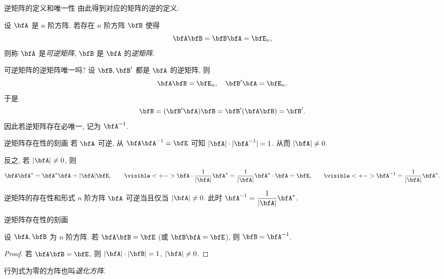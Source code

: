 \begin{frame}{逆矩阵的定义和唯一性}
	\onslide<+->
	由此得到对应的矩阵的逆的定义:
	\onslide<+->
	\begin{definition}
		设 $\bfA$ 是 $n$ 阶方阵. 若存在 $n$ 阶方阵 $\bfB$ 使得
		\[\bfA\bfB=\bfB\bfA=\bfE_n,\]
		则称 $\bfA$ 是\emph{可逆矩阵}, $\bfB$ 是 $\bfA$ 的\emph{逆矩阵}.
	\end{definition}
	\onslide<+->
	可逆矩阵的逆矩阵唯一吗?
	\onslide<+->
	设 $\bfB,\bfB'$ 都是 $\bfA$ 的逆矩阵, 则
	\[\bfA\bfB=\bfE_n,\quad \bfB'\bfA=\bfE_n.\]
	\onslide<+->
	于是
	\[\bfB=(\bfB'\bfA)\bfB=\bfB'(\bfA\bfB)=\bfB'.\]
	\onslide<+->
	因此\alert{若逆矩阵存在必唯一, 记为 $\bfA^{-1}$}.
\end{frame}


\begin{frame}{逆矩阵存在性的刻画}
	\onslide<+->
	若 $\bfA$ 可逆, 从 $\bfA\bfA^{-1}=\bfE$ 可知 $|\bfA|\cdot|\bfA^{-1}|=1$.
	\onslide<+->
	从而 $|\bfA|\neq 0$.

	\onslide<+->
	反之, 若 $|\bfA|\neq0$, 则
	\[\bfA\bfA^*=\bfA^*\bfA=|\bfA|\bfE,\qquad
	\visible<+->{\bfA\cdot\frac1{|\bfA|}\bfA^*=\frac1{|\bfA|}\bfA^*\cdot\bfA=\bfE,}\qquad
	\visible<+->{\bfA^{-1}=\frac1{|\bfA|}\bfA^*.}\]
	\vspace{-.5\baselineskip}
	\onslide<+->
	\begin{algorithm}{逆矩阵的存在性和形式}
		$n$ 阶方阵 $\bfA$ 可逆当且仅当 $|\bfA|\neq 0$.
		此时 $\bfA^{-1}=\dfrac1{|\bfA|}\bfA^*$.
	\end{algorithm}
\end{frame}


\begin{frame}{逆矩阵存在性的刻画}
	\onslide<+->
	\begin{corollary}
		设 $\bfA,\bfB$ 为 $n$ 阶方阵.
		若 $\bfA\bfB=\bfE$ (或 $\bfB\bfA=\bfE$), 则 $\bfB=\bfA^{-1}$.
	\end{corollary}
	\onslide<+->
	\begin{proof}
		若 $\bfA\bfB=\bfE$, 则 $|\bfA|\cdot|\bfB|=1$, $|\bfA|\neq0$.
		\onslide<+->{%
			\[\bfA^{-1}=\bfA^{-1}(\bfA\bfB)=\bfB.\qedhere\]
		}\vspace{-\baselineskip}
	\end{proof}

	\onslide<+->
	行列式为零的方阵也叫\emph{退化方阵}. 
\end{frame}


